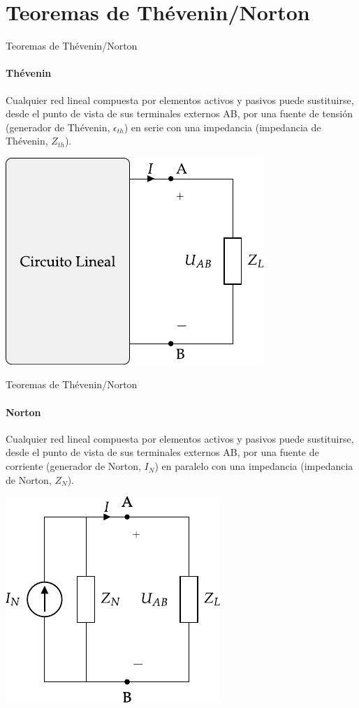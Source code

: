 \documentclass[aspectratio=169, usenames,svgnames,dvipsnames]{beamer}
\begin{document}
\section{Teoremas de Thévenin/Norton}
\label{sec:org1cd8895}

\begin{frame}[label={sec:orgc0ba1e1}]{Teoremas de Thévenin/Norton}
\framesubtitle{Thévenin}

Cualquier \alert{red lineal} compuesta por elementos activos y pasivos puede sustituirse, desde el punto de vista de sus terminales externos AB, por una \alert{fuente de tensión} (generador de Thévenin, \(\epsilon_{th}\)) en \alert{serie} con una impedancia (impedancia de Thévenin, \(Z_{th}\)).

\begin{center}
\includegraphics[height=0.6\textheight]{../figs/EquivalenteThevenin.pdf}
\end{center}
\end{frame}

\begin{frame}[label={sec:org52b56e4}]{Teoremas de Thévenin/Norton}
\framesubtitle{Norton}
Cualquier \alert{red lineal} compuesta por elementos activos y pasivos puede sustituirse, desde el punto de vista de sus terminales externos AB, por una \alert{fuente de corriente} (generador de Norton, \(I_N\)) en \alert{paralelo} con una impedancia (impedancia de Norton, \(Z_N\)).

\begin{center}
\includegraphics[height=0.6\textheight]{../figs/EquivalenteNorton.pdf}
\end{center}
\end{frame}
\end{document}
